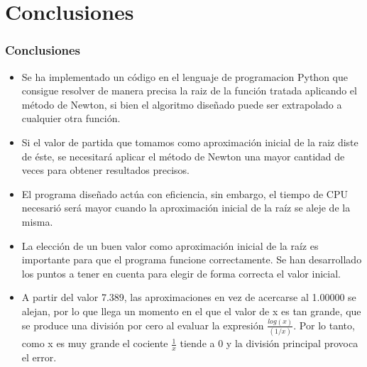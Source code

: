 \documentclass{beamer}
\begin{document}
\section{Conclusiones}
\begin{frame}
\frametitle{Conclusiones}
\begin{itemize}
  \item Se ha implementado un código en el lenguaje de programacion Python que consigue resolver de manera precisa la raiz de la función tratada aplicando el método de Newton, si bien el algoritmo diseñado puede ser extrapolado a cualquier otra función.\pause
  \item Si el valor de partida que tomamos como aproximación inicial de la raiz diste de éste, se necesitará aplicar el método de Newton una mayor cantidad de veces para obtener resultados precisos. \pause
  \item El programa diseñado actúa con eficiencia, sin embargo, el tiempo de CPU necesarió será mayor cuando la aproximación inicial de la raíz se aleje de la misma.\pause
\end{itemize}
\end{frame}
\begin{frame}
\begin{itemize}
  \item La elección de un buen valor como aproximación inicial de la raíz es importante para que el programa funcione correctamente. Se han desarrollado los puntos a tener en cuenta para elegir de forma correcta el valor inicial.\pause
  \item A partir del valor 7.389, las aproximaciones en vez de acercarse al 1.00000 se alejan, por lo que llega un momento en el que el valor de x es tan grande, que se produce una división por cero al evaluar la expresión $\frac{log(x)}{(1/x)}$. Por lo tanto, como x es muy grande el cociente $\frac{1}{x}$ tiende a 0 y la división principal provoca el error.
\end{itemize}
\end{frame}
\end{document}
